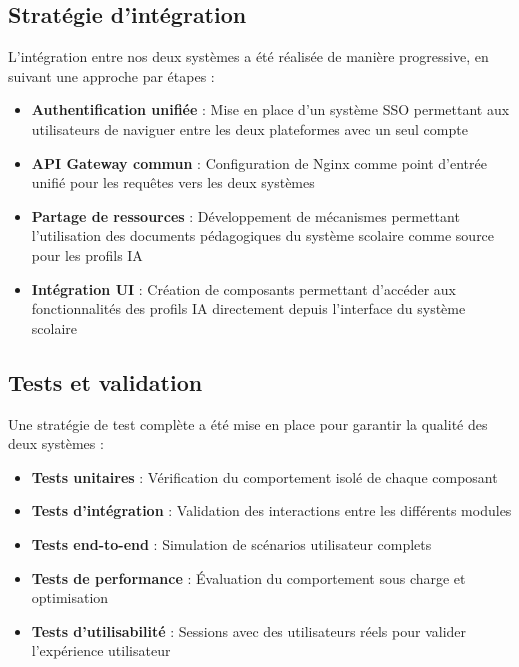 \subsection{Stratégie d'intégration}

L'intégration entre nos deux systèmes a été réalisée de manière progressive, en suivant une approche par étapes :

\begin{itemize}
  \item \textbf{Authentification unifiée} : Mise en place d'un système SSO permettant aux utilisateurs de naviguer entre les deux plateformes avec un seul compte
  
  \item \textbf{API Gateway commun} : Configuration de Nginx comme point d'entrée unifié pour les requêtes vers les deux systèmes
  
  \item \textbf{Partage de ressources} : Développement de mécanismes permettant l'utilisation des documents pédagogiques du système scolaire comme source pour les profils IA
  
  \item \textbf{Intégration UI} : Création de composants permettant d'accéder aux fonctionnalités des profils IA directement depuis l'interface du système scolaire
\end{itemize}

\subsection{Tests et validation}

Une stratégie de test complète a été mise en place pour garantir la qualité des deux systèmes :

\begin{itemize}
  \item \textbf{Tests unitaires} : Vérification du comportement isolé de chaque composant
  
  \item \textbf{Tests d'intégration} : Validation des interactions entre les différents modules
  
  \item \textbf{Tests end-to-end} : Simulation de scénarios utilisateur complets
  
  \item \textbf{Tests de performance} : Évaluation du comportement sous charge et optimisation
  
  \item \textbf{Tests d'utilisabilité} : Sessions avec des utilisateurs réels pour valider l'expérience utilisateur
\end{itemize}


